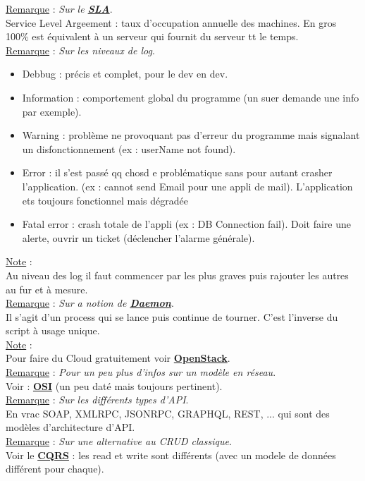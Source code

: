 \documentclass[a4paper,12pt,twoside]{article}
\newcommand{\urlcolor}{magenta}  %
\newcommand{\keycolor}{purple} %
\newcommand{\rem}[2]{\noindent\underline{Remarque} : \textit{#1}.\\ \indent #2}
\newcommand{\note}[1]{\noindent\underline{Note} : \\ \indent #1}
\newcommand{\keyref}[2]{\hypersetup{urlcolor=\keycolor} \href{#1}{\textbf{#2}}\hypersetup{urlcolor=\urlcolor}}
\begin{document}
\rem{Sur le \keyref{https://fr.wikipedia.org/wiki/Service-level_agreement}{SLA}}{Service Level Argeement : taux d'occupation annuelle des machines. En gros 100\% est équivalent à un serveur qui fournit du serveur tt le temps.}\\

\rem{Sur les niveaux de log}{\begin{itemize} 
\item Debbug : précis et complet, pour le dev en dev. 
\item Information : comportement global du programme (un suer demande une info par exemple).
\item Warning : problème ne provoquant pas d'erreur du programme mais signalant un disfonctionnement (ex : userName not found).
\item Error : il s'est passé qq chosd e problématique sans pour autant crasher l'application. (ex : cannot send Email pour une appli de mail). L'application ets toujours fonctionnel mais dégradée
\item Fatal error : crash totale de l'appli (ex : DB Connection fail). Doit faire une alerte, ouvrir un ticket (déclencher l'alarme générale).\\
\end{itemize}}

\note{Au niveau des log il faut commencer par les plus graves puis rajouter les autres au fur et à mesure.}\\

\rem{Sur a notion de \keyref{https://fr.wikipedia.org/wiki/Daemon_(informatique)}{Daemon}}{Il s'agit d'un process qui se lance puis continue de tourner. C'est l'inverse du script à usage unique.}\\

\note{Pour faire du Cloud gratuitement voir \keyref{https://fr.wikipedia.org/wiki/OpenStack}{OpenStack}.}\\

\rem{Pour un peu plus d'infos sur un modèle en réseau}{Voir : \keyref{https://fr.wikipedia.org/wiki/Mod\%C3\%A8le\_OSI}{OSI} (un peu daté mais toujours pertinent).}\\

\rem{Sur les différents types d'API}{En vrac SOAP, XMLRPC, JSONRPC, GRAPHQL, REST, ... qui sont des modèles d'architecture d'API.}\\

\rem{Sur une alternative au CRUD classique}{Voir le \keyref{https://docs.microsoft.com/fr-fr/azure/architecture/patterns/cqrs}{CQRS} : les read et write sont différents (avec un modele de données différent pour chaque).}\\
\end{document}
